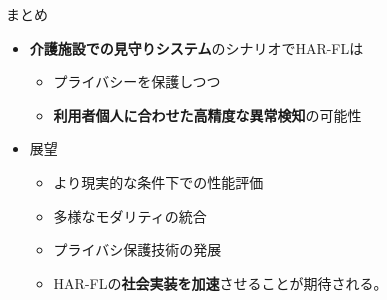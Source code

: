 \documentclass[unicode,12pt,aspectratio=169,dvipdfmx]{beamer}
\begin{document}
\begin{frame}{まとめ}
    \begin{itemize}
        \item \textbf{介護施設での見守りシステム}のシナリオでHAR-FLは
        \begin{itemize}
            \item プライバシーを保護しつつ
            \item \textbf{利用者個人に合わせた高精度な異常検知}の可能性
        \end{itemize}
        \item 展望
        \begin{itemize}
            \item より現実的な条件下での性能評価
            \item 多様なモダリティの統合
            \item プライバシ保護技術の発展
            \item HAR-FLの\textbf{社会実装を加速}させることが期待される。
        \end{itemize}
    \end{itemize}
\end{frame}
\end{document}
